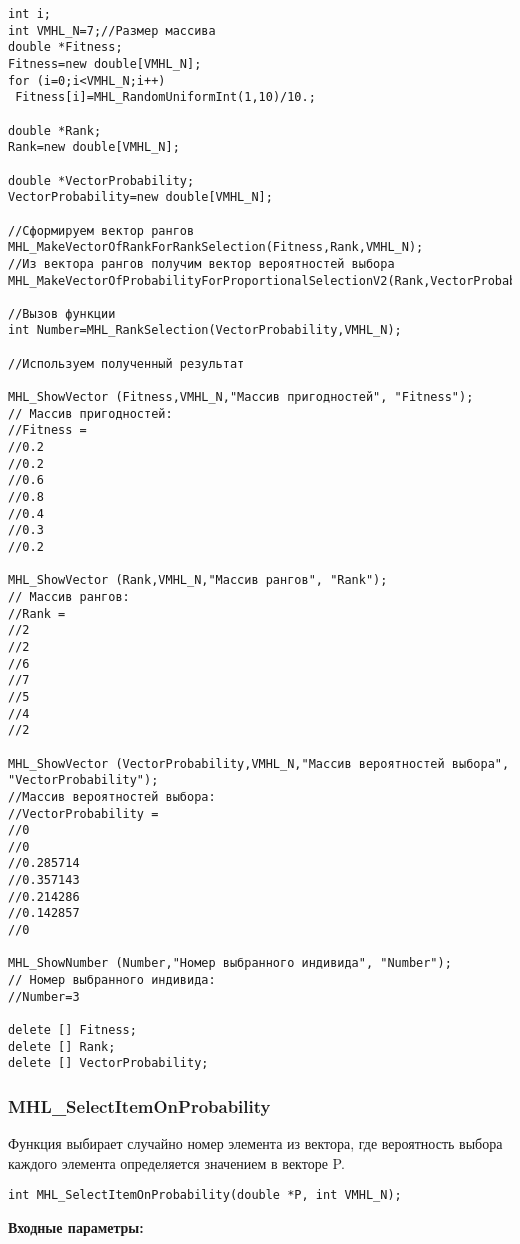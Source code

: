 \documentclass[a4paper,12pt]{article}
\begin{document}
\begin{lstlisting}[label=code_use_MHL_RankSelection,caption=Пример использования]
int i;
int VMHL_N=7;//Размер массива
double *Fitness;
Fitness=new double[VMHL_N];
for (i=0;i<VMHL_N;i++)
 Fitness[i]=MHL_RandomUniformInt(1,10)/10.;

double *Rank;
Rank=new double[VMHL_N];

double *VectorProbability;
VectorProbability=new double[VMHL_N];

//Сформируем вектор рангов
MHL_MakeVectorOfRankForRankSelection(Fitness,Rank,VMHL_N);
//Из вектора рангов получим вектор вероятностей выбора
MHL_MakeVectorOfProbabilityForProportionalSelectionV2(Rank,VectorProbability,VMHL_N);

//Вызов функции
int Number=MHL_RankSelection(VectorProbability,VMHL_N);

//Используем полученный результат

MHL_ShowVector (Fitness,VMHL_N,"Массив пригодностей", "Fitness");
// Массив пригодностей:
//Fitness =	
//0.2
//0.2
//0.6
//0.8
//0.4
//0.3
//0.2

MHL_ShowVector (Rank,VMHL_N,"Массив рангов", "Rank");
// Массив рангов:
//Rank =	
//2
//2
//6
//7
//5
//4
//2

MHL_ShowVector (VectorProbability,VMHL_N,"Массив вероятностей выбора", "VectorProbability");
//Массив вероятностей выбора:
//VectorProbability =	
//0
//0
//0.285714
//0.357143
//0.214286
//0.142857
//0

MHL_ShowNumber (Number,"Номер выбранного индивида", "Number");
// Номер выбранного индивида:
//Number=3

delete [] Fitness;
delete [] Rank;
delete [] VectorProbability;
\end{lstlisting}

\subsubsection{MHL\_SelectItemOnProbability}\label{MHL_SelectItemOnProbability}

Функция выбирает случайно номер элемента из вектора, где вероятность выбора каждого элемента определяется значением в векторе P.


\begin{lstlisting}[label=code_syntax_MHL_SelectItemOnProbability,caption=Синтаксис]
int MHL_SelectItemOnProbability(double *P, int VMHL_N);
\end{lstlisting}

\textbf{Входные параметры:}
 
\end{document}
